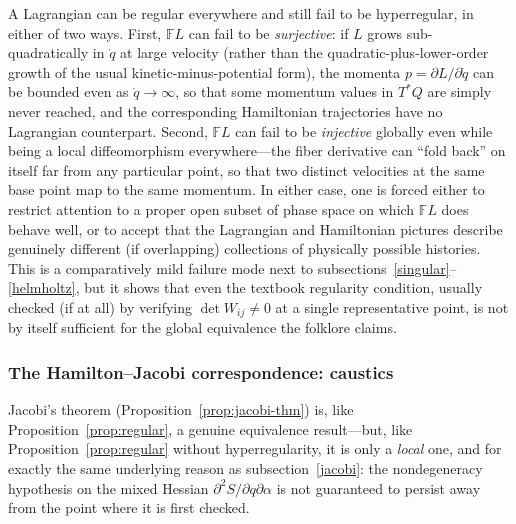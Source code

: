 A Lagrangian can be regular everywhere and still fail to be hyperregular, in
either of two ways. First, $\mathbb{F}L$ can fail to be \emph{surjective}: if
$L$ grows sub-quadratically in $\dot q$ at large velocity (rather than the
quadratic-plus-lower-order growth of the usual kinetic-minus-potential form),
the momenta $p=\partial L/\partial\dot q$ can be bounded even as $\dot
q\to\infty$, so that some momentum values in $T^*Q$ are simply never reached,
and the corresponding Hamiltonian trajectories have no Lagrangian counterpart.
Second, $\mathbb{F}L$ can fail to be \emph{injective} globally even while being
a local diffeomorphism everywhere---the fiber derivative can ``fold back'' on
itself far from any particular point, so that two distinct velocities at the
same base point map to the same momentum. In either case, one is forced either
to restrict attention to a proper open subset of phase space on which
$\mathbb{F}L$ does behave well, or to accept that the Lagrangian and
Hamiltonian pictures describe genuinely different (if overlapping) collections
of physically possible histories. This is a comparatively mild failure mode
next to subsections~\ref{singular}--\ref{helmholtz}, but it shows that even the
textbook regularity condition, usually checked (if at all) by verifying $\det
W_{ij}\neq 0$ at a single representative point, is not by itself sufficient for
the global equivalence the folklore claims.

\subsubsection{The Hamilton--Jacobi correspondence: caustics}
\label{caustics}

Jacobi's theorem (Proposition~\ref{prop:jacobi-thm}) is, like
Proposition~\ref{prop:regular}, a genuine equivalence result---but, like
Proposition~\ref{prop:regular} without hyperregularity, it is only a
\emph{local} one, and for exactly the same underlying reason as
subsection~\ref{jacobi}: the nondegeneracy hypothesis on the mixed Hessian
$\partial^2S/\partial q\partial\alpha$ is not guaranteed to persist away from
the point where it is first checked.

